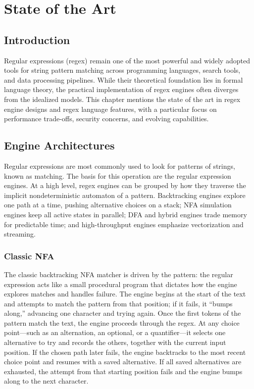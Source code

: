 \chapter{State of the Art}\label{chap:art}

\section{Introduction}
Regular expressions (regex) remain one of the most powerful and widely adopted tools for string pattern matching across programming languages, search tools, and data processing pipelines. While their theoretical foundation lies in formal language theory, the practical implementation of regex engines often diverges from the idealized models. This chapter mentions the state of the art in regex engine designs and regex language features, with a particular focus on performance trade-offs, security concerns, and evolving capabilities.

\section{Engine Architectures}
Regular expressions are most commonly used to look for patterns of strings, known as matching. The basis for this operation are the regular expression engines.
At a high level, regex engines can be grouped by how they traverse the implicit nondeterministic automaton of a pattern. Backtracking engines explore one path at a time, pushing alternative choices on a stack; NFA simulation engines keep all active states in parallel; DFA and hybrid engines trade memory for predictable time; and high-throughput engines emphasize vectorization and streaming.

\subsection{Classic NFA}
The classic backtracking NFA matcher is driven by the pattern: the regular expression acts like a small procedural program that dictates how the engine explores matches and handles failure. The engine begins at the start of the text and attempts to match the pattern from that position; if it fails, it “bumps along,” advancing one character and trying again. Once the first tokens of the pattern match the text, the engine proceeds through the regex. At any choice point—such as an alternation, an optional, or a quantifier—it selects one alternative to try and records the others, together with the current input position. If the chosen path later fails, the engine backtracks to the most recent choice point and resumes with a saved alternative. If all saved alternatives are exhausted, the attempt from that starting position fails and the engine bumps along to the next character.

